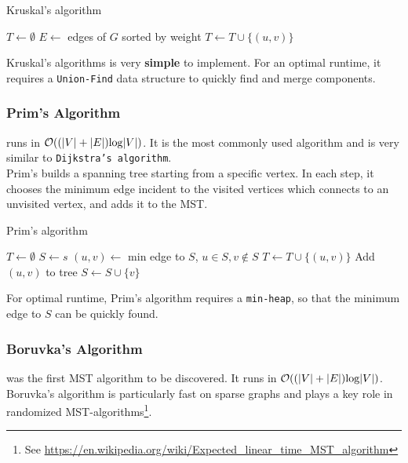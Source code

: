 \documentclass[a3paper, landscape, 11pt]{article} %
\begin{document}
\begin{multicols*}{4}
\begin{algorithm}[H]
\caption{Kruskal's algorithm}
\begin{algorithmic}[1]
\State $T \gets \emptyset$ 
\State $E \gets$ edges of $G$ sorted by weight
		\State $T \gets T \cup \{(u,v)\}$
		
	\EndIf
\EndFor
\EndProcedure
\end{algorithmic}
\end{algorithm}

Kruskal's algorithms is very \textbf{simple} to implement. For an optimal runtime, it requires a \texttt{Union-Find} data structure to quickly find and merge components.

\vfill %

\subsubsection*{Prim's Algorithm}
 runs in $\mathcal{O}((|V|+|E|) \text{log}|V|)$. It is the most commonly used algorithm and is very similar to \texttt{Dijkstra's algorithm}.\\

Prim's builds a spanning tree starting from a specific vertex. In each step, it chooses the minimum edge incident to the visited vertices which connects to an unvisited vertex, and adds it to the MST.

 
 \begin{algorithm}[H]
\caption{Prim's algorithm}
\begin{algorithmic}[1]
\State $T \gets \emptyset$ 
\State $S \gets {s}$ 
	\State $(u,v) \gets$ min edge to $S$, $u\in S, v \not \in S$
	\State $T \gets T \cup \{(u,v)\} $ \Comment Add $(u,v)$ to tree
	\State $S\gets S \cup \{v\}$
\EndWhile
\EndProcedure
\end{algorithmic}
\end{algorithm}
For optimal runtime, Prim's algorithm requires a \texttt{min-heap}, so that the minimum edge to $S$ can be quickly found.


\subsubsection*{Boruvka's Algorithm}

 was the first MST algorithm to be discovered. It runs in $\mathcal{O}((|V|+|E|) \text{log}|V|)$. Boruvka's algorithm is particularly fast on sparse graphs and plays a key role in randomized MST-algorithms\footnote{See \url{https://en.wikipedia.org/wiki/Expected_linear_time_MST_algorithm}}.\\


\end{multicols*}
\end{document}
